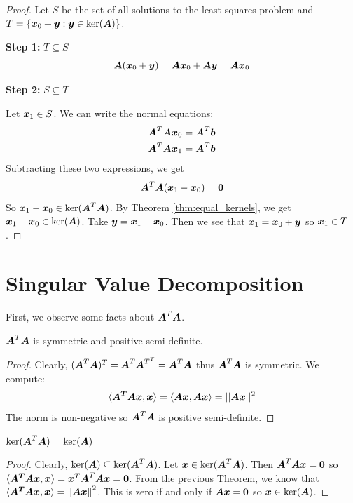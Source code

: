 \begin{proof}
    Let $S$ be the set of all solutions to the least squares problem and $T=\{\boldsymbol{x}_0+\boldsymbol{y}:\boldsymbol{y}\in\ker(\boldsymbol{A})\}$.

    \textbf{Step 1:} $T\subseteq S$
    \[
    \boldsymbol{A}(\boldsymbol{x}_0+\boldsymbol{y})=\boldsymbol{A}\boldsymbol{x}_0+\boldsymbol{A}\boldsymbol{y}=\boldsymbol{A}\boldsymbol{x}_0
    \]

    \textbf{Step 2:} $S\subseteq T$

    Let $\boldsymbol{x}_1\in S$. We can write the normal equations:
    \begin{align*}
        \boldsymbol{A}^T\boldsymbol{A}\boldsymbol{x}_0=\boldsymbol{A}^T\boldsymbol{b}\\
        \boldsymbol{A}^T\boldsymbol{A}\boldsymbol{x}_1=\boldsymbol{A}^T\boldsymbol{b}
    \end{align*}
    Subtracting these two expressions, we get
    \[
    \boldsymbol{A}^T\boldsymbol{A}(\boldsymbol{x}_1-\boldsymbol{x}_0)=\boldsymbol{0}
    \]
    So $\boldsymbol{x}_1-\boldsymbol{x}_0\in\ker(\boldsymbol{A}^T\boldsymbol{A})$. By Theorem \ref{thm:equal_kernels}, we get $\boldsymbol{x}_1-\boldsymbol{x}_0\in\ker(\boldsymbol{A})$. Take $\boldsymbol{y}=\boldsymbol{x}_1-\boldsymbol{x}_0$. Then we see that $\boldsymbol{x}_1=\boldsymbol{x}_0+\boldsymbol{y}$ so $\boldsymbol{x}_1\in T$.
\end{proof}

\section{Singular Value Decomposition}
First, we observe some facts about $\boldsymbol{A}^T\boldsymbol{A}$.
\begin{theorem}\label{thm:modulus_sym_posdef}
    $\boldsymbol{A}^T\boldsymbol{A}$ is symmetric and positive semi-definite.
\end{theorem}

\begin{proof}
    Clearly, $(\boldsymbol{A}^T\boldsymbol{A})^T=\boldsymbol{A}^{T}\boldsymbol{A}^{T^T}=\boldsymbol{A}^T\boldsymbol{A}$ thus $\boldsymbol{A}^T\boldsymbol{A}$ is symmetric. We compute:
    \begin{align*}
        \langle\boldsymbol{A^T}\boldsymbol{A}\boldsymbol{x},\boldsymbol{x}\rangle=\langle\boldsymbol{A}\boldsymbol{x},\boldsymbol{A}\boldsymbol{x}\rangle=||\boldsymbol{A}\boldsymbol{x}||^2
    \end{align*}
    The norm is non-negative so $\boldsymbol{A}^T\boldsymbol{A}$ is positive semi-definite.
\end{proof}

\begin{theorem}\label{thm:equal_kernels}
    $\ker(\boldsymbol{A}^T\boldsymbol{A})=\ker(\boldsymbol{A})$
\end{theorem}

\begin{proof}
    Clearly, $\ker(\boldsymbol{A})\subseteq\ker(\boldsymbol{A}^T\boldsymbol{A})$. Let $\boldsymbol{x}\in\ker(\boldsymbol{A}^T\boldsymbol{A})$. Then $\boldsymbol{A}^T\boldsymbol{A}\boldsymbol{x}=\boldsymbol{0}$ so $\langle\boldsymbol{A^T}\boldsymbol{A}\boldsymbol{x},\boldsymbol{x}\rangle=\boldsymbol{x}^T\boldsymbol{A}^T\boldsymbol{A}\boldsymbol{x}=\boldsymbol{0}$. From the previous Theorem, we know that $\langle\boldsymbol{A^T}\boldsymbol{A}\boldsymbol{x},\boldsymbol{x}\rangle=\left\Vert\boldsymbol{A}\boldsymbol{x}\right\Vert^2$. This is zero if and only if $\boldsymbol{A}\boldsymbol{x}=\boldsymbol{0}$ so $\boldsymbol{x}\in\ker(\boldsymbol{A})$.
\end{proof}


